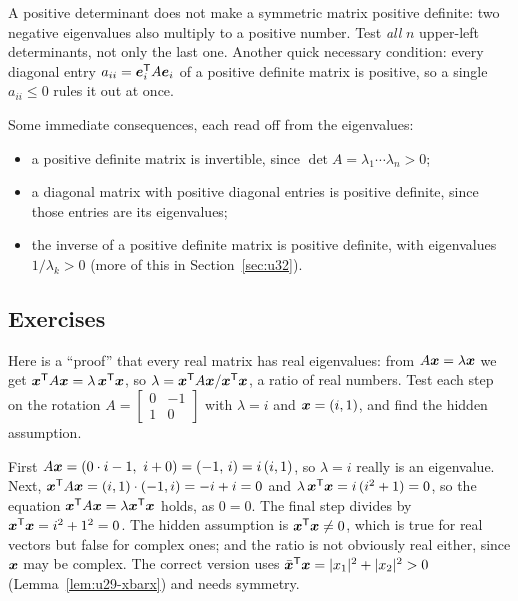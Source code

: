 \begin{trap}
A positive determinant does not make a symmetric matrix positive definite: two negative
eigenvalues also multiply to a positive number. Test \emph{all} $n$ upper-left determinants,
not only the last one. Another quick necessary condition: every diagonal entry
$a_{ii}=\boldsymbol{e}_i^{\mathsf{T}} A\boldsymbol{e}_i$ of a positive definite matrix is positive, so a single
$a_{ii}\le0$ rules it out at once.
\end{trap}

Some immediate consequences, each read off from the eigenvalues:
\begin{itemize}
  \item a positive definite matrix is invertible, since $\det A=\lambda_1\cdots\lambda_n>0$;
  \item a diagonal matrix with positive diagonal entries is positive definite, since those entries
        are its eigenvalues;
  \item the inverse of a positive definite matrix is positive definite, with eigenvalues
        $1/\lambda_k>0$ (more of this in Section~\ref{sec:u32}).
\end{itemize}

\subsection{Exercises}

\begin{exercise}\label{exr:u29-false}
Here is a ``proof'' that every real matrix has real eigenvalues: from $A\boldsymbol{x}=\lambda\boldsymbol{x}$ we get
$\boldsymbol{x}^{\mathsf{T}} A\boldsymbol{x}=\lambda\,\boldsymbol{x}^{\mathsf{T}}\boldsymbol{x}$, so $\lambda=\boldsymbol{x}^{\mathsf{T}} A\boldsymbol{x}/\boldsymbol{x}^{\mathsf{T}}\boldsymbol{x}$, a ratio of real numbers.
Test each step on the rotation $A=\left[\begin{smallmatrix}0&-1\\1&0\end{smallmatrix}\right]$ with
$\lambda=i$ and $\boldsymbol{x}=(i,1)$, and find the hidden assumption.
\end{exercise}
\begin{solution}
First $A\vb{x}=(0\cdot i-1,\ i+0)=(-1,\,i)=i\,(i,1)$, so $\lambda=i$ really is an eigenvalue. Next,
$\boldsymbol{x}^{\mathsf{T}} A\boldsymbol{x}=(i,1)\cdot(-1,i)=-i+i=0$ and $\lambda\,\boldsymbol{x}^{\mathsf{T}}\boldsymbol{x}=i\,(i^2+1)=0$, so the equation
$\boldsymbol{x}^{\mathsf{T}} A\boldsymbol{x}=\lambda\boldsymbol{x}^{\mathsf{T}}\boldsymbol{x}$ holds, as $0=0$. The final step divides by $\boldsymbol{x}^{\mathsf{T}}\boldsymbol{x}=i^2+1^2=0$.
The hidden assumption is $\boldsymbol{x}^{\mathsf{T}}\boldsymbol{x}\ne0$, which is true for real vectors but false for complex
ones; and the ratio is not obviously real either, since $\boldsymbol{x}$ may be complex. The correct
version uses $\bar{\boldsymbol{x}}^{\mathsf{T}}\boldsymbol{x}=|x_1|^2+|x_2|^2>0$ (Lemma~\ref{lem:u29-xbarx}) and needs symmetry.
\end{solution}

